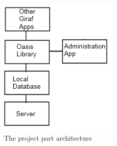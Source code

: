 \begin{figure}
	\centering
		\includegraphics[width=\textwidth]{images/smallPicture.png}
	\caption{The project part architecture}
	\label{fig:smallpic}
\end{figure}